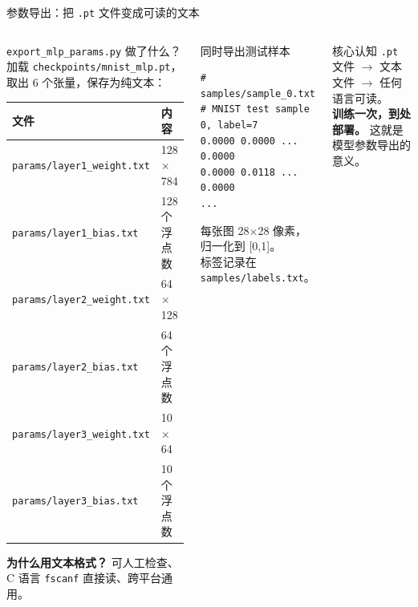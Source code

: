 \documentclass[aspectratio=169]{ctexbeamer}
\begin{document}
\begin{frame}[fragile,shrink=25]{参数导出：把 \texttt{.pt} 文件变成可读的文本}
\small

\begin{columns}[T]
\begin{block}{\texttt{export\_mlp\_params.py} 做了什么？}
\footnotesize
加载 \texttt{checkpoints/mnist\_mlp.pt}，取出 6 个张量，保存为纯文本：

\vspace{-0.1cm}
\begin{center}
\begin{tabular}{l l}
\toprule
\textbf{文件} & \textbf{内容} \\
\midrule
\texttt{params/layer1\_weight.txt} & 128 $\times$ 784 \\
\texttt{params/layer1\_bias.txt}   & 128 个浮点数 \\
\texttt{params/layer2\_weight.txt} & 64 $\times$ 128 \\
\texttt{params/layer2\_bias.txt}   & 64 个浮点数 \\
\texttt{params/layer3\_weight.txt} & 10 $\times$ 64 \\
\texttt{params/layer3\_bias.txt}   & 10 个浮点数 \\
\bottomrule
\end{tabular}
\end{center}
\textbf{为什么用文本格式？} 可人工检查、C 语言 \texttt{fscanf} 直接读、跨平台通用。
\end{block}

\begin{block}{同时导出测试样本}
\footnotesize
\begin{lstlisting}[basicstyle=\ttfamily\footnotesize, frame=none, numbers=none, backgroundcolor=\color{codebg}]
# samples/sample_0.txt
# MNIST test sample 0, label=7
0.0000 0.0000 ... 0.0000
0.0000 0.0118 ... 0.0000
...
\end{lstlisting}
每张图 28$\times$28 像素，归一化到 [0,1]。\\
标签记录在 \texttt{samples/labels.txt}。
\end{block}

\vspace{0.15cm}

\begin{block}{核心认知}
\footnotesize
\texttt{.pt} 文件 $\to$ 文本文件 $\to$ 任何语言可读。\\
\textbf{训练一次，到处部署。} 这就是模型参数导出的意义。
\end{block}
\end{columns}
\end{frame}
\end{document}
